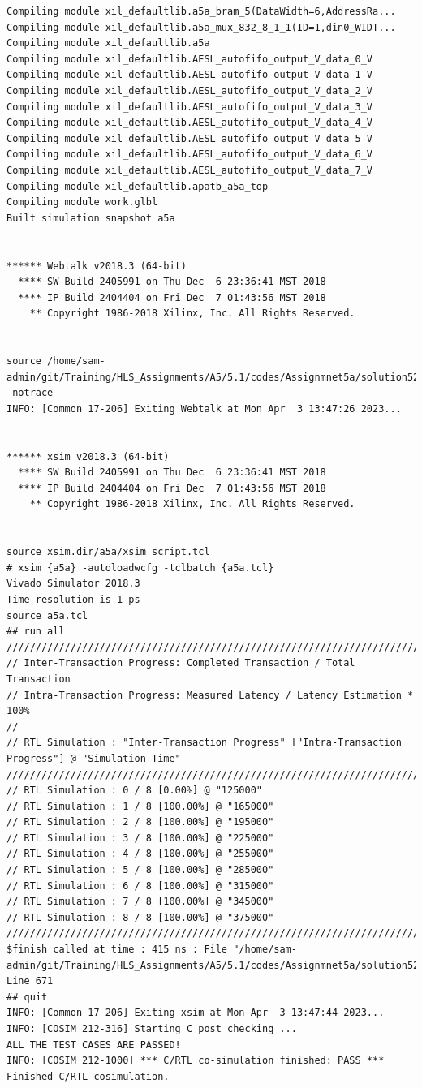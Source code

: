 \documentclass{article}
\begin{document}
\begin{lstlisting}
Compiling module xil_defaultlib.a5a_bram_5(DataWidth=6,AddressRa...
Compiling module xil_defaultlib.a5a_mux_832_8_1_1(ID=1,din0_WIDT...
Compiling module xil_defaultlib.a5a
Compiling module xil_defaultlib.AESL_autofifo_output_V_data_0_V
Compiling module xil_defaultlib.AESL_autofifo_output_V_data_1_V
Compiling module xil_defaultlib.AESL_autofifo_output_V_data_2_V
Compiling module xil_defaultlib.AESL_autofifo_output_V_data_3_V
Compiling module xil_defaultlib.AESL_autofifo_output_V_data_4_V
Compiling module xil_defaultlib.AESL_autofifo_output_V_data_5_V
Compiling module xil_defaultlib.AESL_autofifo_output_V_data_6_V
Compiling module xil_defaultlib.AESL_autofifo_output_V_data_7_V
Compiling module xil_defaultlib.apatb_a5a_top
Compiling module work.glbl
Built simulation snapshot a5a


****** Webtalk v2018.3 (64-bit)
  **** SW Build 2405991 on Thu Dec  6 23:36:41 MST 2018
  **** IP Build 2404404 on Fri Dec  7 01:43:56 MST 2018
    ** Copyright 1986-2018 Xilinx, Inc. All Rights Reserved.


source /home/sam-admin/git/Training/HLS_Assignments/A5/5.1/codes/Assignmnet5a/solution52a/sim/verilog/xsim.dir/a5a/webtalk/xsim_webtalk.tcl -notrace
INFO: [Common 17-206] Exiting Webtalk at Mon Apr  3 13:47:26 2023...


****** xsim v2018.3 (64-bit)
  **** SW Build 2405991 on Thu Dec  6 23:36:41 MST 2018
  **** IP Build 2404404 on Fri Dec  7 01:43:56 MST 2018
    ** Copyright 1986-2018 Xilinx, Inc. All Rights Reserved.


source xsim.dir/a5a/xsim_script.tcl
# xsim {a5a} -autoloadwcfg -tclbatch {a5a.tcl}
Vivado Simulator 2018.3
Time resolution is 1 ps
source a5a.tcl
## run all
////////////////////////////////////////////////////////////////////////////////////
// Inter-Transaction Progress: Completed Transaction / Total Transaction
// Intra-Transaction Progress: Measured Latency / Latency Estimation * 100%
//
// RTL Simulation : "Inter-Transaction Progress" ["Intra-Transaction Progress"] @ "Simulation Time"
////////////////////////////////////////////////////////////////////////////////////
// RTL Simulation : 0 / 8 [0.00%] @ "125000"
// RTL Simulation : 1 / 8 [100.00%] @ "165000"
// RTL Simulation : 2 / 8 [100.00%] @ "195000"
// RTL Simulation : 3 / 8 [100.00%] @ "225000"
// RTL Simulation : 4 / 8 [100.00%] @ "255000"
// RTL Simulation : 5 / 8 [100.00%] @ "285000"
// RTL Simulation : 6 / 8 [100.00%] @ "315000"
// RTL Simulation : 7 / 8 [100.00%] @ "345000"
// RTL Simulation : 8 / 8 [100.00%] @ "375000"
////////////////////////////////////////////////////////////////////////////////////
$finish called at time : 415 ns : File "/home/sam-admin/git/Training/HLS_Assignments/A5/5.1/codes/Assignmnet5a/solution52a/sim/verilog/a5a.autotb.v" Line 671
## quit
INFO: [Common 17-206] Exiting xsim at Mon Apr  3 13:47:44 2023...
INFO: [COSIM 212-316] Starting C post checking ...
ALL THE TEST CASES ARE PASSED!
INFO: [COSIM 212-1000] *** C/RTL co-simulation finished: PASS ***
Finished C/RTL cosimulation.


\end{lstlisting}
\vspace{3cm}
\end{document}
